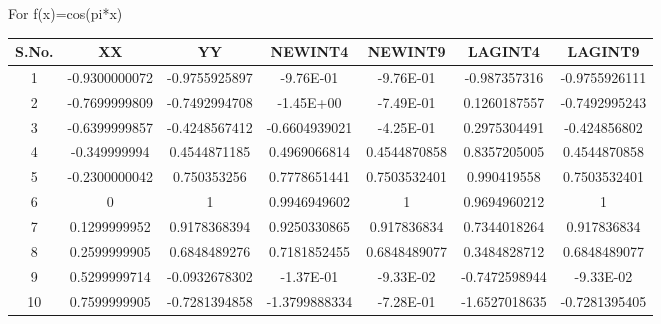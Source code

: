 \documentclass[10pt,a4paper]{article}
\begin{document}
		
	For 	f(x)=cos(pi*x)	\\
		 \begin{center}
		 	\begin{tabular}{|c| c| c| c| c| c| c|}
		 		
				\hline
		S.No.	&XX	&YY	&NEWINT4	&NEWINT9 	&LAGINT4	&LAGINT9\\
		\hline
		1	&-0.9300000072	&-0.9755925897	&-9.76E-01	&-9.76E-01	&-0.987357316	&-0.9755926111\\
		\hline
		2	&-0.7699999809	&-0.7492994708	&-1.45E+00	&-7.49E-01	&0.1260187557	&-0.7492995243\\
		\hline
		3	&-0.6399999857	&-0.4248567412	&-0.6604939021	&-4.25E-01	&0.2975304491	&-0.424856802\\
		\hline
		4	&-0.349999994	&0.4544871185	&0.4969066814	&0.4544870858	&0.8357205005	&0.4544870858\\
		\hline
		5	&-0.2300000042	&0.750353256	&0.7778651441	&0.7503532401	&0.990419558	&0.7503532401\\
		\hline
		6	&0	&1	&0.9946949602	&1	&0.9694960212	&1\\
		\hline
		7	&0.1299999952	&0.9178368394	&0.9250330865	&0.917836834	&0.7344018264	&0.917836834\\
		\hline
		8	&0.2599999905	&0.6848489276	&0.7181852455	&0.6848489077	&0.3484828712	&0.6848489077\\
		\hline
		9	&0.5299999714	&-0.0932678302	&-1.37E-01	&-9.33E-02	&-0.7472598944	&-9.33E-02\\
		\hline
		10	&0.7599999905	&-0.7281394858	&-1.3799888334	&-7.28E-01	&-1.6527018635	&-0.7281395405\\
		\hline
	\end{tabular}
\end{center}
\end{document}
